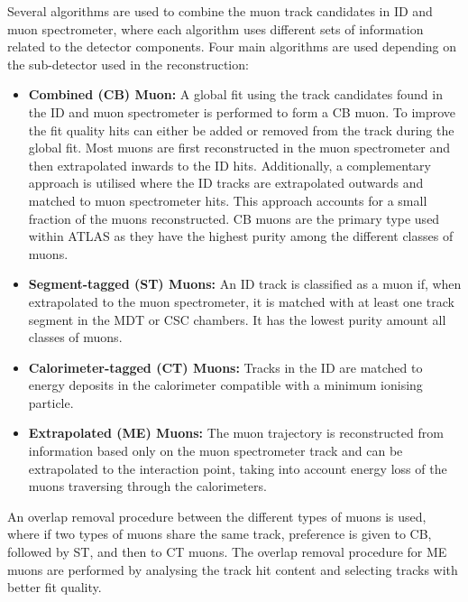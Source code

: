 Several algorithms are used to combine the muon track candidates in ID and muon spectrometer, where each algorithm uses different sets of information related to the detector components. Four main algorithms are used depending on the sub-detector used in the reconstruction:
\begin{itemize}
    \item \textbf{Combined (CB) Muon:} A global fit using the track candidates found in the ID and muon spectrometer is performed to form a CB muon. To improve the fit quality hits can either be added or removed from the track during the global fit. Most muons are first reconstructed in the muon spectrometer and then extrapolated inwards to the ID hits. Additionally, a complementary approach is utilised where the ID tracks are extrapolated outwards and matched to muon spectrometer hits. This approach accounts for a small fraction of the muons reconstructed. CB muons are the primary type used within ATLAS as they have the highest purity among the different classes of muons.
    \item \textbf{Segment-tagged (ST) Muons:}  An ID track is classified as a muon if, when extrapolated to the muon spectrometer, it is matched with at least one track segment in the MDT or CSC chambers. It has the lowest purity amount all classes of muons.
    \item \textbf{Calorimeter-tagged (CT) Muons:} Tracks in the ID are matched to energy deposits in the calorimeter compatible with a minimum ionising particle. 
    \item \textbf{Extrapolated (ME) Muons:} The muon trajectory is reconstructed from information based only on the muon spectrometer track and can be extrapolated to the interaction point, taking into account energy loss of the muons traversing through the calorimeters. 
\end{itemize}

An overlap removal procedure between the different types of muons is used, where if two types of muons share the same track, preference is given to CB, followed by ST, and then to CT muons. The overlap removal procedure for ME muons are performed by analysing the track hit content and selecting tracks with better fit quality. 

